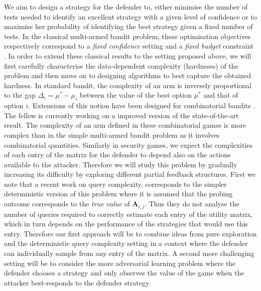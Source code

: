  We aim to design a strategy for the defender to, either minimise the number of tests needed to identify an excellent strategy with a given level of confidence or to maximise her probability of identifying the best strategy given a fixed number of tests. In the classical multi-armed bandit problem, these optimisation objectives respectively correspond to a \textit{fixed confidence} setting\cite{Maron93HR,Even-Dar06AE} and a \textit{fixed budget} constraint \cite{Bubeck09PE,Audibert10BA}. In order to extend these  classical results to the setting proposed above, we will first carefully characterise the data-dependent complexity (hardnesss) of the problem  and then move on to designing algorithms to best capture the obtained hardness. In standard bandit, the complexity of an arm is inversely proportional to the gap $\Delta_i= \mu^*- \mu_i$ between the value of the best option $\mu^*$ and that of option $i$. Extensions of this notion have been designed for combinatorial bandits \cite{chen2014combinatorial}. The fellow is currently working on a improved version of the state-of-the-art result. The complexity of an arm defined in these combinatorial games is  more complex than in the simple multi-armed bandit problem as it involves combinatorial quantities. Similarly in security games, we expect the complexities of each entry of the matrix for the defender to depend also on the actions available to the attacker.
  Therefore we will study this problem by gradually increasing its difficulty by exploring different partial feedback structures. First we note that a recent work\cite{goldberg2014query} on query complexity, corresponds to the simpler deterministic  version of this problem where it is assumed that the probing outcome corresponds to the {\em true value} of $\boldsymbol A_{i,j}$. Thus they do not analyse the number of queries required to correctly estimate each entry of the utility matrix, which in turn depends on the performance of the strategies that would use this entry. Therefore our first approach will be to combine ideas from pure exploration and the deterministic query complexity setting in a context where the defender can individually sample from any entry of the matrix. A second more challenging setting will be to consider the more adversarial learning problem where the defender chooses a strategy and only observes the value of the game when the attacker best-responds to the defender strategy.


